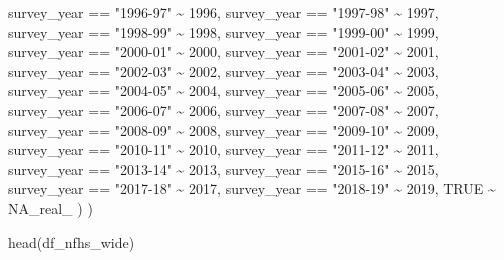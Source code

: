 \documentclass[
  letterpaper,
  DIV=11,
  numbers=noendperiod]{scrartcl}
\newenvironment{Shaded}{\begin{snugshade}}{\end{snugshade}}
\newcommand{\ConstantTok}[1]{\textcolor[rgb]{0.56,0.35,0.01}{#1}}
\newcommand{\DecValTok}[1]{\textcolor[rgb]{0.68,0.00,0.00}{#1}}
\newcommand{\FunctionTok}[1]{\textcolor[rgb]{0.28,0.35,0.67}{#1}}
\newcommand{\NormalTok}[1]{\textcolor[rgb]{0.00,0.23,0.31}{#1}}
\newcommand{\SpecialCharTok}[1]{\textcolor[rgb]{0.37,0.37,0.37}{#1}}
\newcommand{\StringTok}[1]{\textcolor[rgb]{0.13,0.47,0.30}{#1}}
\begin{document}
\begin{Shaded}
\begin{Highlighting}[]
\NormalTok{      survey\_year }\SpecialCharTok{==} \StringTok{"1996{-}97"} \SpecialCharTok{\textasciitilde{}} \DecValTok{1996}\NormalTok{,}
\NormalTok{      survey\_year }\SpecialCharTok{==} \StringTok{"1997{-}98"} \SpecialCharTok{\textasciitilde{}} \DecValTok{1997}\NormalTok{,}
\NormalTok{      survey\_year }\SpecialCharTok{==} \StringTok{"1998{-}99"} \SpecialCharTok{\textasciitilde{}} \DecValTok{1998}\NormalTok{,}
\NormalTok{      survey\_year }\SpecialCharTok{==} \StringTok{"1999{-}00"} \SpecialCharTok{\textasciitilde{}} \DecValTok{1999}\NormalTok{,}
\NormalTok{      survey\_year }\SpecialCharTok{==} \StringTok{"2000{-}01"} \SpecialCharTok{\textasciitilde{}} \DecValTok{2000}\NormalTok{,}
\NormalTok{      survey\_year }\SpecialCharTok{==} \StringTok{"2001{-}02"} \SpecialCharTok{\textasciitilde{}} \DecValTok{2001}\NormalTok{,}
\NormalTok{      survey\_year }\SpecialCharTok{==} \StringTok{"2002{-}03"} \SpecialCharTok{\textasciitilde{}} \DecValTok{2002}\NormalTok{,}
\NormalTok{      survey\_year }\SpecialCharTok{==} \StringTok{"2003{-}04"} \SpecialCharTok{\textasciitilde{}} \DecValTok{2003}\NormalTok{,}
\NormalTok{      survey\_year }\SpecialCharTok{==} \StringTok{"2004{-}05"} \SpecialCharTok{\textasciitilde{}} \DecValTok{2004}\NormalTok{,}
\NormalTok{      survey\_year }\SpecialCharTok{==} \StringTok{"2005{-}06"} \SpecialCharTok{\textasciitilde{}} \DecValTok{2005}\NormalTok{,}
\NormalTok{      survey\_year }\SpecialCharTok{==} \StringTok{"2006{-}07"} \SpecialCharTok{\textasciitilde{}} \DecValTok{2006}\NormalTok{,}
\NormalTok{      survey\_year }\SpecialCharTok{==} \StringTok{"2007{-}08"} \SpecialCharTok{\textasciitilde{}} \DecValTok{2007}\NormalTok{,}
\NormalTok{      survey\_year }\SpecialCharTok{==} \StringTok{"2008{-}09"} \SpecialCharTok{\textasciitilde{}} \DecValTok{2008}\NormalTok{,}
\NormalTok{      survey\_year }\SpecialCharTok{==} \StringTok{"2009{-}10"} \SpecialCharTok{\textasciitilde{}} \DecValTok{2009}\NormalTok{,}
\NormalTok{      survey\_year }\SpecialCharTok{==} \StringTok{"2010{-}11"} \SpecialCharTok{\textasciitilde{}} \DecValTok{2010}\NormalTok{,}
\NormalTok{      survey\_year }\SpecialCharTok{==} \StringTok{"2011{-}12"} \SpecialCharTok{\textasciitilde{}} \DecValTok{2011}\NormalTok{,}
\NormalTok{      survey\_year }\SpecialCharTok{==} \StringTok{"2013{-}14"} \SpecialCharTok{\textasciitilde{}} \DecValTok{2013}\NormalTok{,}
\NormalTok{      survey\_year }\SpecialCharTok{==} \StringTok{"2015{-}16"} \SpecialCharTok{\textasciitilde{}} \DecValTok{2015}\NormalTok{,}
\NormalTok{      survey\_year }\SpecialCharTok{==} \StringTok{"2017{-}18"} \SpecialCharTok{\textasciitilde{}} \DecValTok{2017}\NormalTok{,}
\NormalTok{      survey\_year }\SpecialCharTok{==} \StringTok{"2018{-}19"} \SpecialCharTok{\textasciitilde{}} \DecValTok{2019}\NormalTok{,}
      \ConstantTok{TRUE} \SpecialCharTok{\textasciitilde{}} \ConstantTok{NA\_real\_}
\NormalTok{    )}
\NormalTok{  )}

\FunctionTok{head}\NormalTok{(df\_nfhs\_wide)}
\end{Highlighting}
\end{Shaded}
\end{document}
